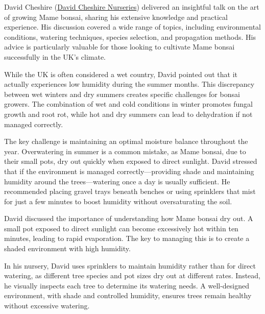 David Cheshire (\href{https://www.davidcheshirenurseries.co.uk}{David Cheshire Nurseries}) delivered an insightful talk on the art of growing Mame bonsai, sharing his extensive knowledge and practical experience. His discussion covered a wide range of topics, including environmental conditions, watering techniques, species selection, and propagation methods. His advice is particularly valuable for those looking to cultivate Mame bonsai successfully in the UK's climate. 

\medskip

\noindent
While the UK is often considered a wet country, David pointed out that it actually experiences low humidity during the summer months. This discrepancy between wet winters and dry summers creates specific challenges for bonsai growers. The combination of wet and cold conditions in winter promotes fungal growth and root rot, while hot and dry summers can lead to dehydration if not managed correctly.

The key challenge is maintaining an optimal moisture balance throughout the year. Overwatering in summer is a common mistake, as Mame bonsai, due to their small pots, dry out quickly when exposed to direct sunlight. David stressed that if the environment is managed correctly---providing shade and maintaining humidity around the trees---watering once a day is usually sufficient. He recommended placing gravel trays beneath benches or using sprinklers that mist for just a few minutes to boost humidity without over\-saturating the soil.

\medskip

\noindent
David discussed the importance of understanding how Mame bonsai dry out. A small pot exposed to direct sunlight can become excessively hot within ten minutes, leading to rapid evaporation. The key to managing this is to create a shaded environment with high humidity. 

In his nursery, David uses sprinklers to maintain humidity rather than for direct watering, as different tree species and pot sizes dry out at different rates. Instead, he visually inspects each tree to determine its watering needs. A well\--designed environment, with shade and controlled humidity, ensures trees remain healthy without excessive watering.

